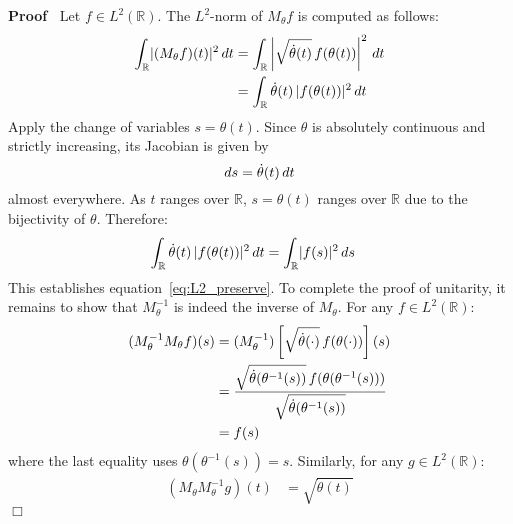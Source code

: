 \documentclass{article}
\newcommand{\cdummy}{\cdot}
\newenvironment{proof}{\noindent\textbf{Proof\ }}{\hspace*{\fill}$\Box$\medskip}
\begin{document}
\begin{proof}
Let $f \in L^2 (\mathbb{R})$. The $L^2$-norm of $M_{\theta} f$ is computed
as follows:
\begin{align}
\int_{\mathbb{R}} \lvert (M_{\theta} f) (t) \rvert^2 \hspace{0.17em} dt &
= \int_{\mathbb{R}} \left| \sqrt{\dot{\theta} (t)} \hspace{0.17em} f
(\theta (t)) \right|^2 \hspace{0.17em} dt \\
& = \int_{\mathbb{R}} \dot{\theta} (t) \hspace{0.17em} \lvert f (\theta
(t)) \rvert^2 \hspace{0.17em} dt
\end{align}
Apply the change of variables $s = \theta (t)$. Since $\theta$ is absolutely
continuous and strictly increasing, its Jacobian is given by
\begin{equation}
ds = \dot{\theta} (t) \hspace{0.17em} dt
\end{equation}
almost everywhere. As $t$ ranges over $\mathbb{R}$, $s = \theta (t)$ ranges
over $\mathbb{R}$ due to the bijectivity of $\theta$. Therefore:
\begin{align}
\int_{\mathbb{R}} \dot{\theta} (t) \hspace{0.17em} \lvert f (\theta (t))
\rvert^2 \hspace{0.17em} dt & = \int_{\mathbb{R}} \lvert f (s) \rvert^2
\hspace{0.17em} ds
\end{align}
This establishes equation~\eqref{eq:L2_preserve}. To complete the proof of
unitarity, it remains to show that $M_{\theta}^{- 1}$ is indeed the inverse
of $M_{\theta}$. For any $f \in L^2 (\mathbb{R})$:
\begin{align}
(M_{\theta}^{- 1} M_{\theta} f) (s) & = (M_{\theta}^{- 1}) \left[
\sqrt{\dot{\theta} (\cdummy)} \hspace{0.17em} f (\theta (\cdot)) \right]
(s) \\
& = \frac{\sqrt{\dot{\theta} (\theta^{- 1} (s))} \hspace{0.17em} f
(\theta (\theta^{- 1} (s)))}{\sqrt{\dot{\theta} (\theta^{- 1} (s))}} \\
& = f (s)
\end{align}
where the last equality uses $\theta (\theta^{- 1} (s)) = s$. Similarly, for
any $g \in L^2 (\mathbb{R})$:
\begin{align}
(M_{\theta} M_{\theta}^{- 1} g) (t) & = \sqrt{\dot{\theta} (t)}

\end{align}
\end{proof}
\end{document}
